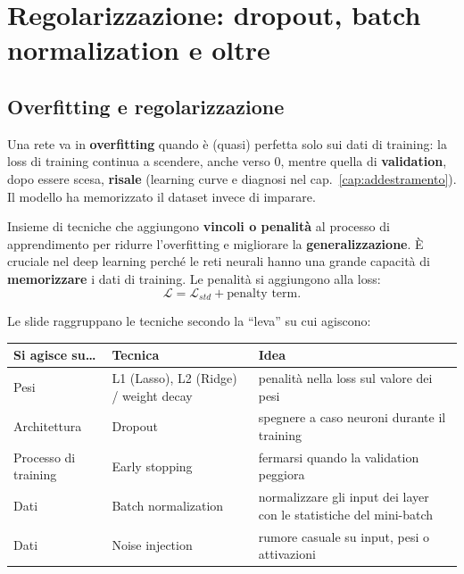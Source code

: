 \chapter{Regolarizzazione: dropout, batch normalization e oltre}
\label{cap:regolarizzazione}

\section{Overfitting e regolarizzazione}
Una rete va in \textbf{overfitting} quando è (quasi) perfetta solo sui dati di training: la loss di training continua a scendere,
anche verso 0, mentre quella di \textbf{validation}, dopo essere scesa, \textbf{risale} (learning curve e diagnosi nel
cap.~\ref{cap:addestramento}). Il modello ha memorizzato il dataset invece di imparare.

\begin{definizione}[regolarizzazione]
Insieme di tecniche che aggiungono \textbf{vincoli o penalità} al processo di apprendimento per ridurre l'overfitting e migliorare la
\textbf{generalizzazione}. È cruciale nel deep learning perché le reti neurali hanno una grande capacità di \textbf{memorizzare} i
dati di training. Le penalità si aggiungono alla loss:
\[
\mathcal{L} = \mathcal{L}_{std} + \text{penalty term}.
\]
\end{definizione}

Le slide raggruppano le tecniche secondo la ``leva'' su cui agiscono:
\begin{center}
\small
\begin{tabularx}{\textwidth}{l l X}
\toprule
\textbf{Si agisce su\ldots} & \textbf{Tecnica} & \textbf{Idea}\\
\midrule
Pesi & L1 (Lasso), L2 (Ridge) / weight decay & penalità nella loss sul valore dei pesi\\
Architettura & Dropout & spegnere a caso neuroni durante il training\\
Processo di training & Early stopping & fermarsi quando la validation peggiora\\
Dati & Batch normalization & normalizzare gli input dei layer con le statistiche del mini-batch\\
Dati & Noise injection & rumore casuale su input, pesi o attivazioni\\
\bottomrule
\end{tabularx}
\end{center}

